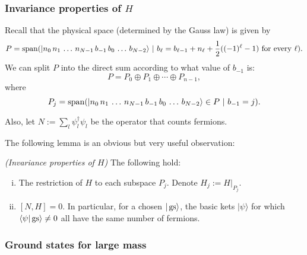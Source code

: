 \subsubsection{Invariance properties of $H$}
Recall that the physical space (determined by the Gauss law) is given by
	\[
	P = \operatorname{span} ( |n_0\, n_1\, \ldots \, n_{N-1} \, b_{-1}\, b_0\, \ldots\, b_{N-2}\rangle \ | \ b_{\ell} =b_{\ell-1} + n_{\ell} + \frac{1}{2}((-1)^\ell-1) \ \text{for every} \ \ell).
	\]
	We can split $P$ into the direct sum according to what value of $b_{-1}$ is:
	\[
	P = P_0 \oplus P_1 \oplus \cdots \oplus P_{n-1},
	\]
	where
	\[
	P_j = \operatorname{span}( |n_0\, n_1\, \ldots \, n_{N-1} \, b_{-1}\, b_0\, \ldots\, b_{N-2}\rangle \in P \ | \ b_{-1} = j).
	\]

Also, let $N:= \sum_{l} \psi_l^\dagger \psi_l$ be the operator that counts fermions.

The following lemma is an obvious but very useful observation:

\begin{lemma}\emph{(Invariance properties of $H$)} The following hold:
\begin{enumerate}[(i)]
\item The restriction of $H$ to each subspace $P_j$. Denote $H_j := H|_{P_j}$.
\item $[N,H] = 0$. In particular, for a chosen $|\operatorname{gs}\rangle$, the basic kets $|\psi\rangle$ for which $\langle \psi | \operatorname{gs} \rangle \neq 0$ all have the same number of fermions.
\end{enumerate}
\end{lemma}

\subsubsection{Ground states for large mass}


